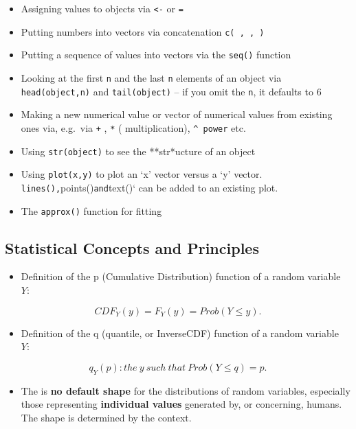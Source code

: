 \documentclass[]{book}
\providecommand{\tightlist}{%
  \setlength{\itemsep}{0pt}\setlength{\parskip}{0pt}}
\begin{document}
\begin{itemize}
\item
  Assigning values to objects via \texttt{\textless{}-} or \texttt{=}
\item
  Putting numbers into vectors via concatenation \texttt{c(\ ,\ ,\ )}
\item
  Putting a sequence of values into vectors via the \texttt{seq()} function
\item
  Looking at the first \texttt{n} and the last \texttt{n} elements of an object via \texttt{head(object,n)} and \texttt{tail(object)} -- if you omit the \texttt{n}, it defaults to 6
\item
  Making a new numerical value or vector of numerical values from existing ones via, e.g.~via \texttt{+} , \texttt{*} ( multiplication), \texttt{\^{}\ power} etc.
\item
  Using \texttt{str(object)} to see the **str*ucture of an object
\item
  Using \texttt{plot(x,y)} to plot an `x' vector versus a `y' vector. \texttt{lines(),}points()\texttt{and}text()` can be added to an existing plot.
\item
  The \texttt{approx()} function for fitting
\end{itemize}

\hypertarget{statistical-concepts-and-principles}{%
\subsection{Statistical Concepts and Principles}\label{statistical-concepts-and-principles}}

\begin{itemize}
\tightlist
\item
  Definition of the p (Cumulative Distribution) function of a random variable \(Y:\)
\end{itemize}

\[CDF_Y(y) = F_Y(y) =  Prob( Y \le y).\]

\begin{itemize}
\tightlist
\item
  Definition of the q (quantile, or InverseCDF) function of a random variable \(Y:\)
\end{itemize}

\[ q_Y(p) : the \ y \ such \ that \ Prob( Y \le q) = p.\]

\begin{itemize}
\tightlist
\item
  The is \textbf{no default shape} for the distributions of random variables, especially those representing \textbf{individual values} generated by, or concerning, humans. The shape is determined by the context.
\end{itemize}
\end{document}
